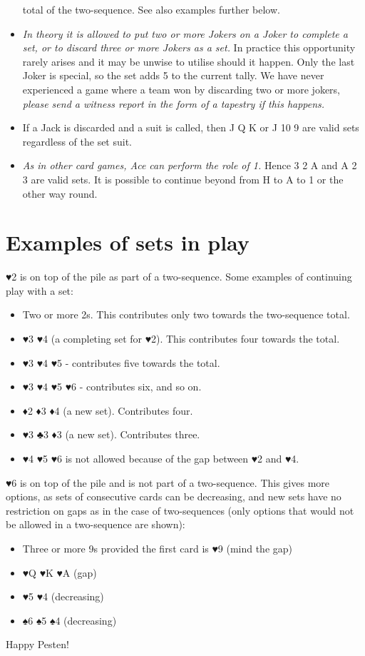 \documentclass[a4paper,11pt,headings=standardclasses]{scrartcl}
\begin{document}
\begin{itemize}
        total of the two-sequence. See also examples further below.
  \item \emph{In theory it is allowed to put two or more Jokers on a Joker to
        complete a set, or to discard three or more Jokers as a set.} In
        practice this opportunity rarely arises and it may be unwise to utilise
        should it happen. Only the last Joker is special, so the set adds 5 to
        the current tally. We have never experienced a game where a team won by
        discarding two or more jokers, \emph{please send a witness report in the
        form of a tapestry if this happens.}
  \item If a Jack is discarded and a suit is called, then J Q K or J 10 9 are
        valid sets regardless of the set suit.
  \item \emph{As in other card games, Ace can perform the role of 1.} Hence 3 2
        A and A 2 3 are valid sets. It is possible to continue beyond from H to
        A to 1 or the other way round.
 \end{itemize}

 \section{Examples of sets in play}

 ♥2 is on top of the pile as part of a two-sequence. Some examples of continuing
 play with a set:

 \begin{itemize}
  \item Two or more 2s. This contributes only two towards the two-sequence
        total.
  \item ♥3 ♥4 (a completing set for ♥2). This contributes four towards the
        total.
  \item ♥3 ♥4 ♥5 - contributes five towards the total.
  \item ♥3 ♥4 ♥5 ♥6 - contributes six, and so on.
  \item ♦2 ♦3 ♦4 (a new set). Contributes four.
  \item ♥3 ♣3 ♦3 (a new set). Contributes three.
  \item ♥4 ♥5 ♥6 is not allowed because of the gap between ♥2 and ♥4.
 \end{itemize}

 ♥6 is on top of the pile and is not part of a two-sequence. This gives more
 options, as sets of consecutive cards can be decreasing, and new sets have no
 restriction on gaps as in the case of two-sequences (only options that would
 not be allowed in a two-sequence are shown):

 \begin{itemize}
  \item Three or more 9s provided the first card is ♥9 (mind the gap)
  \item ♥Q ♥K ♥A (gap)
  \item ♥5 ♥4 (decreasing)
  \item ♠6 ♠5 ♠4 (decreasing)
 \end{itemize}

 Happy Pesten!
\end{document}
